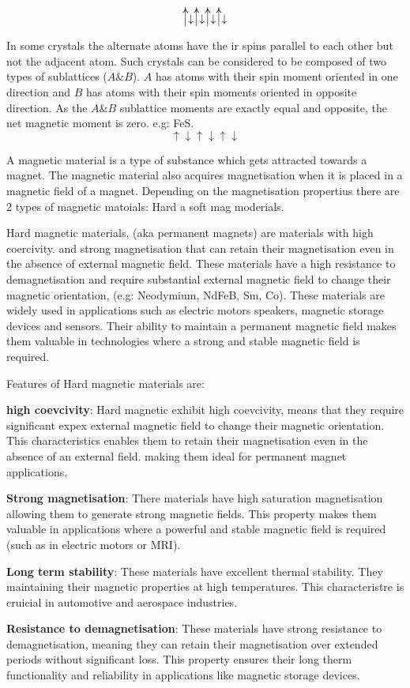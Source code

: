 \documentclass[12pt, a4paper]{article}
\begin{document}
$$
	\longUparrow \downarrow \longUparrow \downarrow \longUparrow \downarrow \longUparrow \downarrow
$$

In some crystals the alternate atoms have the ir spins parallel to each other but not the adjacent atom. Such crystals can be considered to be composed of two types of sublattices ($A \& B$). $A$ has atoms with their spin moment oriented in one direction and $B$ has atoms with their spin moments oriented in opposite direction. As the $A \& B$ sublattice moments are exactly equal and opposite, the net magnetic moment is zero.
e.g: FeS.
$$\uparrow \downarrow \uparrow \downarrow \uparrow \downarrow$$

A magnetic material is a type of substance which gets attracted towards a magnet. The magnetic material also acquires magnetisation when it is placed in a magnetic field of a magnet. Depending on the magnetisation propertius there are 2 types of magnetic matoials: Hard a soft mag moderials.

Hard magnetic materials, (aka permanent magnets) are materials with high coercivity. and strong magnetisation that can retain their magnetisation even in the absence of external magnetic field. These materials have a high resistance to demagnetisation and require substantial external magnetic field to change their magnetic orientation, (e.g: Neodymium, NdFeB, Sm, Co). These materials are widely used in applications such as electric motors speakers, magnetic storage devices and sensors. Their ability to maintain a permanent magnetic field makes them valuable in technologies where a strong and stable magnetic field is required.

Features of Hard magnetic materials are:
\noparindent

\textbf{high coevcivity}: Hard magnetic exhibit high coevcivity, means that they require significant expex external magnetic field to change their magnetic orientation. This characteristics enables them to retain their magnetisation even in the absence of an external field. making them ideal for permanent magnet applications.

\textbf{Strong magnetisation}: There materials have high saturation magnetisation allowing them to generate strong magnetic fields. This property makes them valuable in applications where a powerful and stable magnetic field is required (such as in electric motors or MRI).

\textbf{Long term stability}: These materials have excellent thermal stability. They maintaining their magnetic properties at high temperatures. This characteristre is cruicial in automotive and aerospace industries.

\textbf{Resistance to demagnetisation}: These materials have strong resistance to demagnetisation, meaning they can retain their magnetisation over extended periods without significant loss. This property ensures their long therm functionality and reliability in applications like magnetic storage devices.



\end{document}
